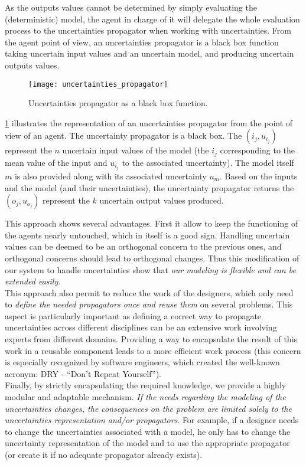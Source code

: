 As the outputs values cannot be determined by simply evaluating the (deterministic) model, the agent in charge of it will delegate the whole evaluation process to the uncertainties propagator when working with uncertainties. From the agent point of view, an uncertainties propagator is a black box function taking uncertain input values and an uncertain model, and producing uncertain outputs values.

\begin{figure}
\center
\texttt{[image: uncertainties\_propagator]}
\caption{Uncertainties propagator as a black box function.}\label{uncertainties_propagator}
\end{figure}

\figurename{} \ref{uncertainties_propagator} illustrates the representation of an uncertainties propagator from the point of view of an agent. The uncertainty propagator is a black box. The $(i_j, u_{i_j})$ represent the $n$ uncertain input values of the model (the $i_j$ corresponding to the mean value of the input and $u_{i_j}$ to the associated uncertainty). The model itself $m$ is also provided along with its associated uncertainty $u_m$. Based on the inputs and the model (and their uncertainties), the uncertainty propagator returns the $(o_j, u_{o_j})$ represent the $k$ uncertain output values produced.

This approach shows several advantages. First it allow to keep the functioning of the agents nearly untouched, which in itself is a good sign. Handling uncertain values can be deemed to be an orthogonal concern to the previous ones, and orthogonal concerns should lead to orthogonal changes. Thus this modification of our system to handle uncertainties show that \emph{our modeling is flexible and can be extended easily}.\\
This approach also permit to reduce the work of the designers, which only need to \emph{define the needed propagators once and reuse them} on several problems. This aspect is particularly important as defining a correct way to propagate uncertainties across different disciplines can be an extensive work involving experts from different domains. Providing a way to encapsulate the result of this work in a reusable component leads to a more efficient work process (this concern is especially recognized by software engineers, which created the well-known acronym: DRY - \enquote{Don't Repeat Yourself}).\\
Finally, by strictly encapsulating the required knowledge, we provide a highly modular and adaptable mechanism. \emph{If the needs regarding the modeling of the uncertainties changes, the consequences on the problem are limited solely to the uncertainties representation and/or propagators}. For example, if a designer needs to change the uncertainties associated with a model, he only has to change the uncertainty representation of the model and to use the appropriate propagator (or create it if no adequate propagator already exists).

